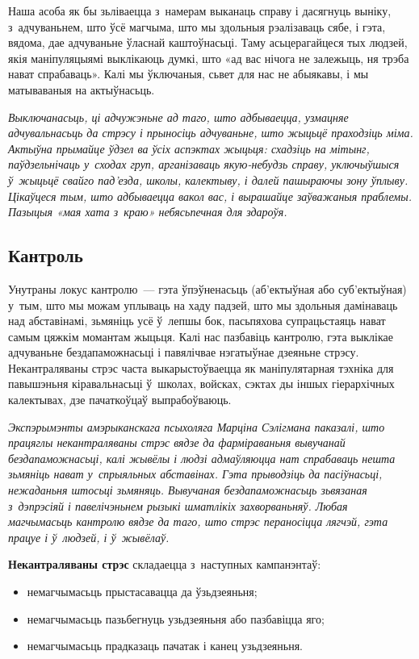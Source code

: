 
Наша асоба як бы зьліваецца з~намерам выканаць справу і дасягнуць выніку, з~адчуваньнем, што ўсё магчыма, што мы здольныя рэалізаваць сябе, і гэта, вядома, дае адчуваньне ўласнай каштоўнасьці. Таму асьцерагайцеся тых людзей, якія маніпуляцыямі выклікаюць думкі, што «ад вас нічога не залежыць, ня трэба нават спрабаваць». Калі мы ўключаныя, сьвет для нас не абыякавы, і мы матываваныя на актыўнасьць.

\emph{Выключанасьць, ці адчужэньне ад таго, што адбываецца, узмацняе адчувальнасьць да стрэсу і прыносіць адчуваньне, што жыцьцё праходзіць міма. Актыўна прымайце ўдзел ва ўсіх аспэктах жыцьця: схадзіць на мітынг, паўдзельнічаць у~сходах груп, арганізаваць якую-небудзь справу, уключыўшыся ў~жыцьцё свайго пад'езда, школы, калектыву, і далей пашыраючы зону ўплыву. Цікаўцеся тым, што адбываецца вакол вас, і вырашайце заўважаныя праблемы. Пазыцыя «мая хата з~краю» небясьпечная для здароўя.}

\subsection*{Кантроль} 

Унутраны локус кантролю~--- гэта ўпэўненасьць (аб'ектыўная або суб'ектыўная) у~тым, што мы можам уплываць на хаду падзей, што мы здольныя дамінаваць над абставінамі, зьмяніць усё ў~лепшы бок, пасьпяхова супрацьстаяць нават самым цяжкім момантам жыцьця. Калі нас пазбавіць кантролю, гэта выклікае адчуваньне бездапаможнасьці і павялічвае нэгатыўнае дзеяньне стрэсу. Некантраляваны стрэс часта выкарыстоўваецца як маніпулятарная тэхніка для павышэньня кіравальнасьці ў~школах, войсках, сэктах ды іншых гіерархічных калектывах, дзе пачаткоўцаў выпрабоўваюць.

\emph{Экспэрымэнты амэрыканскага псыхоляга Марціна Сэлігмана паказалі, што працяглы некантраляваны стрэс вядзе да фарміраваньня вывучанай бездапаможнасьці, калі жывёлы і людзі адмаўляюцца нат спрабаваць нешта зьмяніць нават у~спрыяльных абставінах. Гэта прыводзіць да пасіўнасьці, нежаданьня штосьці зьмяняць. Вывучаная бездапаможнасьць зьвязаная з~дэпрэсіяй і павелічэньнем рызыкі шматлікіх захворваньняў. Любая магчымасьць кантролю вядзе да таго, што стрэс пераносіцца лягчэй, гэта працуе і ў~людзей, і ў~жывёлаў.}

\textbf{Некантраляваны стрэс} складаецца з~наступных кампанэнтаў: 
\begin{itemize}
  \item немагчымасьць прыстасавацца да ўзьдзеяньня;
  \item немагчымасьць пазьбегнуць узьдзеяньня або пазбавіцца яго;
  \item немагчымасьць прадказаць пачатак і канец узьдзеяньня.
\end{itemize}

